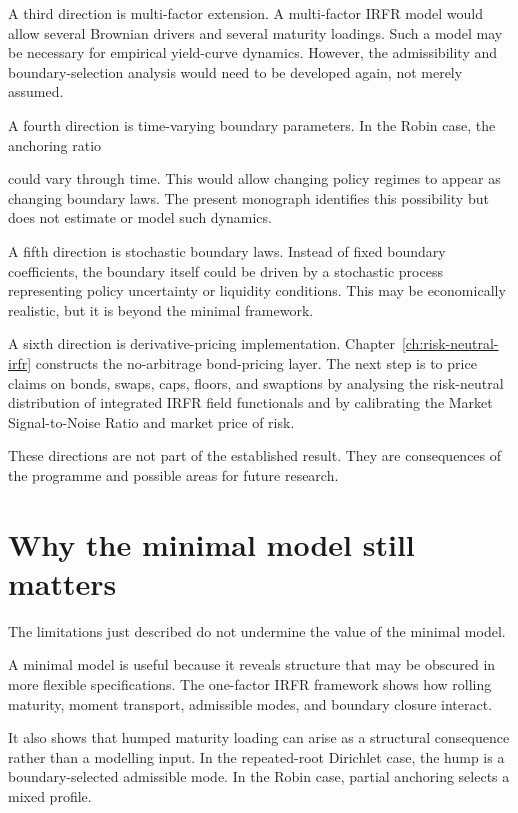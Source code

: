\documentclass[11pt,oneside]{book}
\begin{document}
A third direction is multi-factor extension. A multi-factor IRFR model
would allow several Brownian drivers and several maturity loadings. Such
a model may be necessary for empirical yield-curve dynamics. However,
the admissibility and boundary-selection analysis would need to be
developed again, not merely assumed.

A fourth direction is time-varying boundary parameters. In the Robin
case, the anchoring ratio

could vary through time. This would allow changing policy regimes to
appear as changing boundary laws. The present monograph identifies this
possibility but does not estimate or model such dynamics.

A fifth direction is stochastic boundary laws. Instead of fixed boundary
coefficients, the boundary itself could be driven by a stochastic
process representing policy uncertainty or liquidity conditions. This
may be economically realistic, but it is beyond the minimal framework.

A sixth direction is derivative-pricing implementation. Chapter~\ref{ch:risk-neutral-irfr}
constructs the no-arbitrage bond-pricing layer. The next step is to
price claims on bonds, swaps, caps, floors, and swaptions by analysing
the risk-neutral distribution of integrated IRFR field functionals and
by calibrating the Market Signal-to-Noise Ratio and market price of risk.

These directions are not part of the established result. They are
consequences of the programme and possible areas for future research.

\section{Why the minimal model still
matters}\label{why-the-minimal-model-still-matters}

The limitations just described do not undermine the value of the minimal
model.

A minimal model is useful because it reveals structure that may be
obscured in more flexible specifications. The one-factor IRFR framework
shows how rolling maturity, moment transport, admissible modes, and
boundary closure interact.

It also shows that humped maturity loading can arise as a structural
consequence rather than a modelling input. In the repeated-root
Dirichlet case, the hump is a boundary-selected admissible mode. In the
Robin case, partial anchoring selects a mixed profile.
\end{document}
